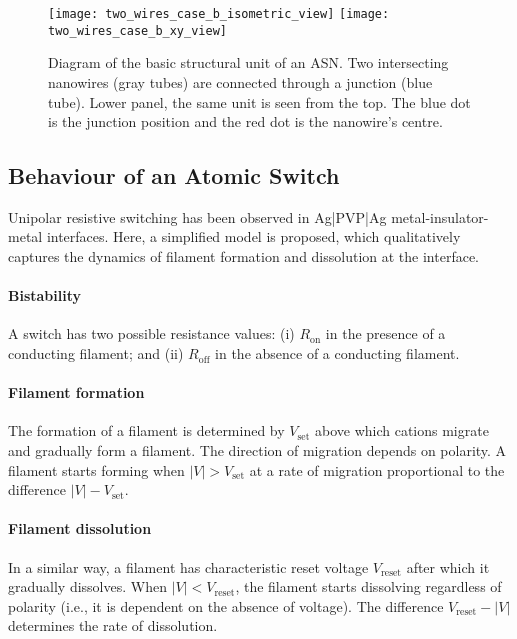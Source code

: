 \documentclass[preprint,10pt, authoryear, a4]{elsarticle}
\begin{document}
\begin{figure}
\begin{center}
\texttt{[image: two\_wires\_case\_b\_isometric\_view]}%
\texttt{[image: two\_wires\_case\_b\_xy\_view]}
\caption{
Diagram of the basic structural unit of an ASN. Two intersecting nanowires (gray tubes) are connected through a junction (blue tube). Lower panel, the same unit is seen from the top.
The blue dot is the junction position and the red dot is the nanowire's centre.}
\label{fig:two_wires}
\end{center}
\end{figure}


\subsection{Behaviour of an Atomic Switch}
\label{sec:dynamics}

Unipolar resistive switching has been observed in Ag|PVP|Ag metal-insulator-metal 
interfaces. Here, a simplified model is proposed, which qualitatively
captures the dynamics of filament formation and dissolution at the interface.

\paragraph{Bistability} A switch has two possible resistance values: (i) $R_{\mbox{on}}$  in the
presence of a conducting filament; and (ii) $R_{\mbox{off}}$ in the absence of
a conducting filament. 

\paragraph{Filament formation} The formation of a filament is determined by $V_{\mbox{set}}$ above which
cations migrate and gradually form a filament. The direction of migration
depends on polarity.  A filament starts forming when
$\left|V\right|>V_{\mbox{set}}$ at a rate of migration proportional to the
difference $\left|V\right|-V_{\mbox{set}}$.

\paragraph{Filament dissolution} In a similar way, a filament has characteristic reset voltage $V_{\mbox{reset}}$
after which it gradually dissolves. When $\left|V\right|<V_{\mbox{reset}}$,
the filament starts dissolving regardless of polarity (i.e., it is dependent on
the absence of voltage). The difference 
$V_{\mbox{reset}}-\left|V\right|$ determines the rate of dissolution.
\end{document}
